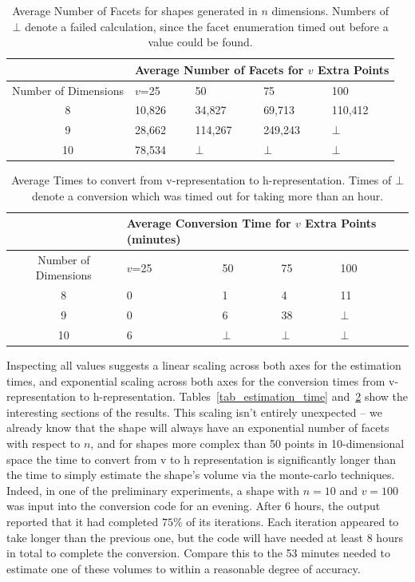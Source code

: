 \begin{table}[h]
\centering
\begin{tabular}{| c || p{1cm} | p{1cm} | p{1cm} | p{1cm}|}
\hline
&\multicolumn{4}{p{5cm}|}{Average Number of Facets for $v$ Extra Points} \\
\hline
Number of Dimensions & $v$=25 & 50 & 75 & 100\\
\hline
8  & 10,826 & 34,827  & 69,713  & 110,412 \\
9  & 28,662 & 114,267 & 249,243 & $\bot$ \\
10 & 78,534 & $\bot$ & $\bot$ & $\bot$ \\
\hline
\end{tabular}
\caption{Average Number of Facets for shapes generated in $n$ dimensions. Numbers of $\bot$ denote a failed calculation, since the facet enumeration timed out before a value could be found.}
\label{tab_num_facets}
\end{table}

\begin{table}[h]
\centering
\begin{tabular}{| c || p{1cm} | p{1cm} | p{1cm} | p{1cm}|}
\hline
&\multicolumn{4}{p{5cm}|}{Average Conversion Time for $v$ Extra Points (minutes)} \\
\hline
Number of Dimensions & $v$=25 & 50 & 75 & 100\\
\hline
8 & 0   & 1      & 4      & 11 \\
9 & 0   & 6      & 38     & $\bot$ \\
10& 6   & $\bot$ & $\bot$ & $\bot$ \\
\hline
\end{tabular}
\caption{Average Times to convert from v-representation to h-representation. Times of $\bot$ denote a conversion which was timed out for taking more than an hour.}
\label{tab_conversion_time}
\end{table}

Inspecting all values suggests a linear scaling across both axes for the estimation times, and exponential scaling across both axes for the conversion times from v-representation to h-representation. Tables~\ref{tab_estimation_time} and~\ref{tab_conversion_time} show the interesting sections of the results. This scaling isn't entirely unexpected -- we already know that the shape will always have an exponential number of facets with respect to $n$, and for shapes more complex than 50 points in 10-dimensional space the time to convert from v to h representation is significantly longer than the time to simply estimate the shape's volume via the monte-carlo techniques. Indeed, in one of the preliminary experiments, a shape with $n=10$ and $v=100$ was input into the conversion code for an evening. After 6 hours, the output reported that it had completed $75\%$ of its iterations. Each iteration appeared to take longer than the previous one, but the code will have needed at least 8 hours in total to complete the conversion. Compare this to the 53 minutes needed to estimate one of these volumes to within a reasonable degree of accuracy.

